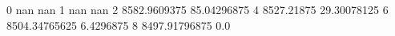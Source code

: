 0 nan nan
1 nan nan
2 8582.9609375 85.04296875
4 8527.21875 29.30078125
6 8504.34765625 6.4296875
8 8497.91796875 0.0
